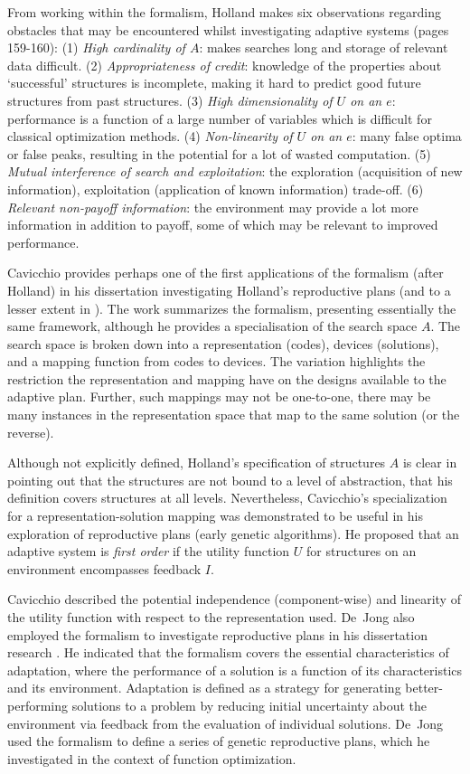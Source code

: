 \documentclass[a4paper, 11pt]{article}
\begin{document}
From working within the formalism, Holland makes six observations regarding obstacles that may be encountered whilst investigating adaptive systems \cite{Holland1975} (pages 159-160): (1) \emph{High cardinality of $A$}: makes searches long and storage of relevant data difficult. (2) \emph{Appropriateness of credit}: knowledge of the properties about `successful' structures is incomplete, making it hard to predict good future structures from past structures. (3) \emph{High dimensionality of $U$ on an $e$}: performance is a function of a large number of variables which is difficult for classical optimization methods. (4) \emph{Non-linearity of $U$ on an $e$}: many false optima or false peaks, resulting in the potential for a lot of wasted computation. (5) \emph{Mutual interference of search and exploitation}: the exploration (acquisition of new information), exploitation (application of known information) trade-off. (6) \emph{Relevant non-payoff information}: the environment may provide a lot more information in addition to payoff, some of which may be relevant to improved performance.

Cavicchio provides perhaps one of the first applications of the formalism (after Holland) in his dissertation investigating Holland's reproductive plans \cite{Cavicchio1970} (and to a lesser extent in \cite{Daniel1972}). The work summarizes the formalism, presenting essentially the same framework, although he provides a specialisation of the search space $A$. The search space is broken down into a representation (codes), devices (solutions), and a mapping function from codes to devices. The variation highlights the restriction the representation and mapping have on the designs available to the adaptive plan. Further, such mappings may not be one-to-one, there may be many instances in the representation space that map to the same solution (or the reverse). 

Although not explicitly defined, Holland's specification of structures $A$ is clear in pointing out that the structures are not bound to a level of abstraction, that his definition covers structures at all levels. Nevertheless, Cavicchio's specialization for a representation-solution mapping was demonstrated to be useful in his exploration of reproductive plans (early genetic algorithms). He proposed that an adaptive system is \emph{first order} if the utility function $U$ for structures on an environment encompasses feedback $I$.

 Cavicchio described the potential independence (component-wise) and linearity of the utility function with respect to the representation used. De~Jong also employed the formalism to investigate reproductive plans in his dissertation research \cite{Jong1975}. He indicated that the formalism covers the essential characteristics of adaptation, where the performance of a solution is a function of its characteristics and its environment. Adaptation is defined as a strategy for generating better-performing solutions to a problem by reducing initial uncertainty about the environment via feedback from the evaluation of individual solutions. De~Jong used the formalism to define a series of genetic reproductive plans, which he investigated in the context of function optimization.
\end{document}
